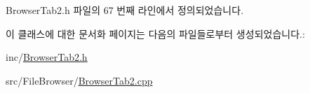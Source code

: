 Browser\+Tab2.\+h 파일의 67 번째 라인에서 정의되었습니다.



이 클래스에 대한 문서화 페이지는 다음의 파일들로부터 생성되었습니다.\+:\begin{DoxyCompactItemize}
\item 
inc/\hyperlink{_browser_tab2_8h}{Browser\+Tab2.\+h}\item 
src/\+File\+Browser/\hyperlink{_browser_tab2_8cpp}{Browser\+Tab2.\+cpp}\end{DoxyCompactItemize}
